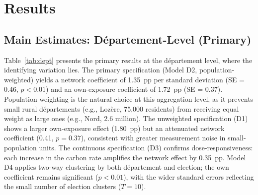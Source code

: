 \documentclass[12pt]{article}
\providecommand{\euro}{\texteuro}
\newcommand{\dept}{d\'{e}partement}
\newcommand{\depts}{d\'{e}partements}
\begin{document}

\section{Results}
\label{sec:results}

\subsection{Main Estimates: D\'{e}partement-Level (Primary)}

Table~\ref{tab:dept} presents the primary results at the \dept{} level, where the identifying variation lies. The primary specification (Model D2, population-weighted) yields a network coefficient of 1.35~pp per standard deviation (SE = 0.46, $p < 0.01$) and an own-exposure coefficient of 1.72~pp (SE = 0.37). Population weighting is the natural choice at this aggregation level, as it prevents small rural \depts{} (e.g., Loz\`{e}re, 75,000 residents) from receiving equal weight as large ones (e.g., Nord, 2.6 million). The unweighted specification (D1) shows a larger own-exposure effect (1.80~pp) but an attenuated network coefficient (0.41, $p = 0.37$), consistent with greater measurement noise in small-population units. The continuous specification (D3) confirms dose-responsiveness: each \euro 10 increase in the carbon rate amplifies the network effect by 0.35~pp. Model D4 applies two-way clustering by both \dept{} and election; the own coefficient remains significant ($p < 0.01$), with the wider standard errors reflecting the small number of election clusters ($T = 10$).
\end{document}
